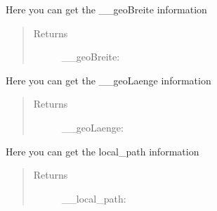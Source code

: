 \documentclass[letterpaper,10pt,english]{sphinxmanual}
\begin{document}
\begin{fulllineitems}
\begin{fulllineitems}
\begin{quote}
\begin{description}
\end{description}\end{quote}

\end{fulllineitems}


\begin{fulllineitems}
\label{\detokenize{DwdDataPrep:DwdDataPrep.Station.get_geobreite}}
\sphinxAtStartPar
{} Here you can get the \_\_geoBreite information
\begin{quote}\begin{description}
\item[{Returns}] \leavevmode
\sphinxAtStartPar
\_\_geoBreite: 

\end{description}\end{quote}

\end{fulllineitems}


\begin{fulllineitems}
\label{\detokenize{DwdDataPrep:DwdDataPrep.Station.get_geolaenge}}
\sphinxAtStartPar
{} Here you can get the \_\_geoLaenge information
\begin{quote}\begin{description}
\item[{Returns}] \leavevmode
\sphinxAtStartPar
\_\_geoLaenge: 

\end{description}\end{quote}

\end{fulllineitems}


\begin{fulllineitems}
\label{\detokenize{DwdDataPrep:DwdDataPrep.Station.get_local_path}}
\sphinxAtStartPar
{} Here you can get the local\_path information
\begin{quote}\begin{description}
\item[{Returns}] \leavevmode
\sphinxAtStartPar
\_\_local\_path: 


\end{description}
\end{quote}
\end{fulllineitems}
\end{fulllineitems}
\end{document}
